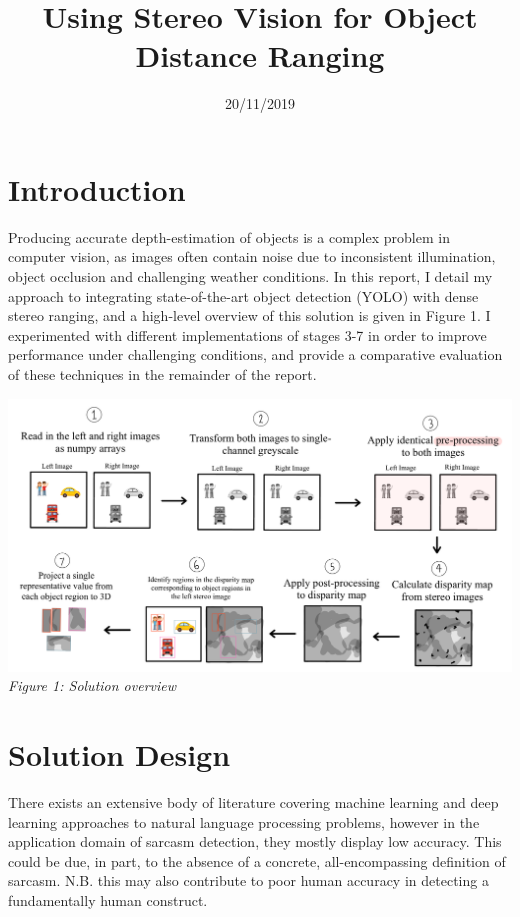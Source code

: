 \documentclass[12pt,a4paper]{article}
\title{Using Stereo Vision for Object Distance Ranging}
\author{} %
\date{20/11/2019}
\begin{document}
\maketitle

\vspace{3 mm}
\section{Introduction}
\noindent Producing accurate depth-estimation of objects is a complex problem in computer vision, as images often contain noise due to inconsistent illumination, object occlusion and challenging weather conditions. In this report, I detail my approach to integrating state-of-the-art object detection (YOLO) with dense stereo ranging, and a high-level overview of this solution is given in Figure 1.  I experimented with different implementations of stages 3-7 in order to improve performance under challenging conditions, and provide a comparative evaluation of these techniques in the remainder of the report.


\begin{center}
	\includegraphics[scale=0.25]{Solutiondiagram}
	\textit{Figure 1: Solution overview}
\end{center}


\newpage



\section{Solution Design}
\noindent There exists an extensive body of literature covering machine learning and deep learning approaches to natural language processing problems, however in the application domain of sarcasm detection, they mostly display low accuracy. This could be due, in part, to the absence of a concrete, all-encompassing definition of sarcasm. N.B. this may also contribute to poor human accuracy in detecting a fundamentally human construct. \\



\end{document}
